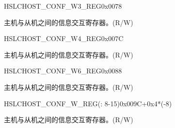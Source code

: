 \begin{register}{H}{SLCHOST\_CONF\_W3\_REG}{0x0078}\label{regdesc:SLCHOSTCONFW3REG}
%
%
\regnewline%
\begin{regdesc}\begin{reglist}
\label{fielddesc:SLCHOSTSLCHOSTCONF3}\item [SLCHOST\_SLCHOST\_CONF3] 主机与从机之间的信息交互寄存器。(R/W)
\end{reglist}\end{regdesc}
\end{register}


\begin{register}{H}{SLCHOST\_CONF\_W4\_REG}{0x007C}\label{regdesc:SLCHOSTCONFW4REG}
%
%
\regnewline%
\begin{regdesc}\begin{reglist}
\label{fielddesc:SLCHOSTSLCHOSTCONF4}\item [SLCHOST\_SLCHOST\_CONF4] 主机与从机之间的信息交互寄存器。(R/W)
\end{reglist}\end{regdesc}
\end{register}


\begin{register}{H}{SLCHOST\_CONF\_W6\_REG}{0x0088}\label{regdesc:SLCHOSTCONFW6REG}
%
\regnewline%
\begin{regdesc}\begin{reglist}
\label{fielddesc:SLCHOSTSLCHOSTCONF6}\item [SLCHOST\_SLCHOST\_CONF6] 主机与从机之间的信息交互寄存器。(R/W)
\end{reglist}\end{regdesc}
\end{register}


\begin{register}{H}{SLCHOST\_CONF\_W\_REG(: 8-15)}{0x009C+0x4*(-8)}\label{regdesc:SLCHOSTCONFW815REG}
%
\regnewline%
\begin{regdesc}\begin{reglist}
\label{fielddesc:SLCHOSTSLCHOSTCONF815}\item [SLCHOST\_SLCHOST\_CONF\regindex{n}] 主机与从机之间的信息交互寄存器。(R/W)
\end{reglist}\end{regdesc}
\end{register}